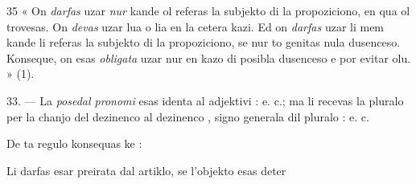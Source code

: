 \begin{VUpage}[39]{35}
« On \textit{darfas} uzar  \textit{nur} kande ol referas la subjekto\nl
di la propoziciono, en qua ol trovesas. On \textit{devas} uzar lua o\nl
lia en la cetera kazi. Ed on \textit{darfas} uzar li mem kande li\nl
referas la subjekto di la propoziciono, se nur to genitas nula\nl
dusenceso. Konseque, on esas \textit{obligata} uzar  nur en kazo\nl
di posibla dusenceso e por evitar olu. » (1).

\VUblanc{6.02pt}%
33. --- La \textit{posedal pronomi} esas identa al adjektivi :\nl
{} e. c.; ma li recevas la pluralo per la chanjo\nl
del dezinenco  al dezinenco , signo generala dil pluralo :\nl
{} e. c.

De ta regulo konsequas ke :

Li darfas esar preirata dal artiklo, se l'objekto esas deter\cc
\end{VUpage}


